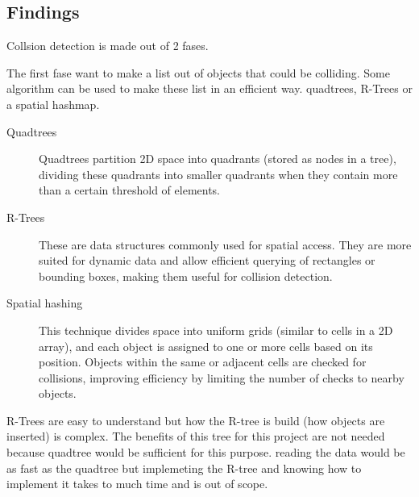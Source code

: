 \documentclass{projdoc}
\begin{document}
\subsection{Findings}

Collsion detection is made out of 2 fases.





The first fase want to make a list out of objects that could be colliding. Some
algorithm can be used to make these list in an efficient way. quadtrees, R-Trees or
a spatial hashmap.

\begin{description}
	\item[Quadtrees] Quadtrees partition 2D space into quadrants (stored as nodes in a
		tree), dividing these quadrants into smaller quadrants when they contain more
		than a certain threshold of elements.
	\item[R-Trees] These are data structures commonly used for spatial access. They are
		more suited for dynamic data and allow efficient querying of rectangles or
		bounding boxes, making them useful for collision detection.
	\item[Spatial hashing] This technique divides space into uniform grids (similar to
		cells in a 2D array), and each object is assigned to one or more cells based on
		its position. Objects within the same or adjacent cells are checked for
		collisions, improving efficiency by limiting the number of checks to nearby
		objects.
\end{description}

R-Trees are easy to understand but how the R-tree is build (how objects are inserted)
is complex. The benefits of this tree for this project are not needed because
quadtree would be sufficient for this purpose. reading the data would be as fast as
the quadtree but implemeting the R-tree and knowing how to implement it takes to much
time and is out of scope.
\end{document}
